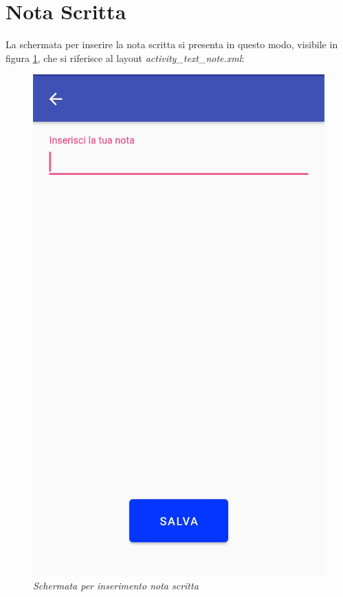 \section{Nota Scritta}
\label{notascritta}
La schermata per inserire la nota scritta si presenta in questo modo, visibile in figura \ref{fig:notascritta}, che si riferisce al layout \textit{activity\_text\_note.xml}:
\begin{figure}[!h]
    \centering
	\includegraphics[scale=0.14]{Tesi/images/AttNota.jpg}
	\caption{\textit{Schermata per inserimento nota scritta}}
	\label{fig:notascritta}
\end{figure}
